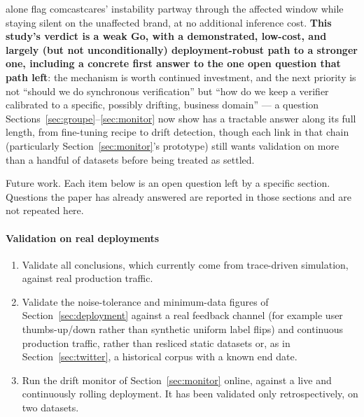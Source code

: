 \documentclass[11pt]{article}
\begin{document}
alone flag comcastcares' instability partway through the affected window while staying silent on the unaffected brand, at no additional inference cost. \textbf{This study's verdict is a weak Go, with a demonstrated, low-cost, and largely (but not unconditionally) deployment-robust path to a stronger one, including a concrete first answer to the one open question that path left}: the mechanism is worth continued investment, and the next priority is not ``should we do synchronous verification'' but ``how do we keep a verifier calibrated to a specific, possibly drifting, business domain'' --- a question Sections~\ref{sec:groupe}--\ref{sec:monitor} now show has a tractable answer along its full length, from fine-tuning recipe to drift detection, though each link in that chain (particularly Section~\ref{sec:monitor}'s prototype) still wants validation on more than a handful of datasets before being treated as settled.

Future work. Each item below is an open question left by a specific section. Questions the paper has already answered are reported in those sections and are not repeated here.

\paragraph{Validation on real deployments}
\begin{enumerate}[leftmargin=*]
  \item Validate all conclusions, which currently come from trace-driven simulation, against real production traffic.
  \item Validate the noise-tolerance and minimum-data figures of Section~\ref{sec:deployment} against a real feedback channel (for example user thumbs-up/down rather than synthetic uniform label flips) and continuous production traffic, rather than resliced static datasets or, as in Section~\ref{sec:twitter}, a historical corpus with a known end date.
  \item Run the drift monitor of Section~\ref{sec:monitor} online, against a live and continuously rolling deployment. It has been validated only retrospectively, on two datasets.
\end{enumerate}
\end{document}
